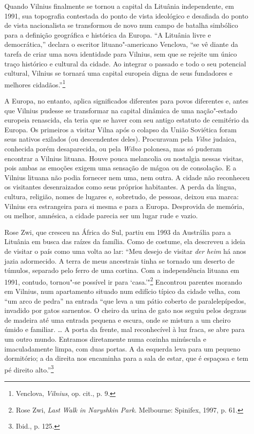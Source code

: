 Quando Vilnius finalmente se tornou a capital da Lituânia independente,
em 1991, sua topografia contestada do ponto de vista ideológico e desafiada do ponto de vista nacionalista se transformou de novo num campo de batalha simbólico para a
definição geográfica e histórica da Europa. ``A Lituânia livre e
democrática,'' declara o escritor lituano"-americano Venclova, ``se vê
diante da tarefa de criar uma nova identidade para Vilnius, sem que se
rejeite um único traço histórico e cultural da cidade. Ao integrar o
passado e todo o seu potencial cultural, Vilnius se tornará uma capital
europeia digna de seus fundadores e melhores cidadãos.''\footnote{Venclova, \textit{Vilnius}, op. cit., p. 9.}
\asterisc

A Europa, no entanto, aplica significados diferentes para povos
diferentes e, antes que Vilnius pudesse se transformar na capital
dinâmica de uma nação"-estado europeia renascida, ela teria que se haver
com seu antigo estatuto de cemitério da Europa. Os primeiros a visitar
Vilna após o colapso da União Soviética foram seus nativos exilados (ou
descendentes deles). Procuravam pela \textit{Vilne} judaica, conhecida porém
desaparecida, ou pela \textit{Wilno} polonesa, mas só puderam encontrar a Vilnius
lituana. Houve pouca melancolia ou nostalgia nessas visitas, pois ambas
as emoções exigem uma sensação de mágoa ou de consolação. E a Vilnius
lituana não podia fornecer nem uma, nem outra. A cidade não reconheceu
os visitantes desenraizados como seus próprios habitantes. A perda da
língua, cultura, religião, nomes de lugares e, sobretudo, de pessoas,
deixou sua marca: Vilnius era estrangeira para si mesma e para a Europa.
Desprovida de memória, ou melhor, amnésica, a cidade parecia ser um
lugar rude e vazio.

Rose Zwi, que cresceu na África do Sul, partiu em 1993 da Austrália para
a Lituânia em busca das raízes da família. Como de costume, ela
descreveu a ideia de visitar o país como uma volta ao lar: ``Meu desejo
de visitar \textit{der heim} há anos jazia adormecido. A terra de meus
ancestrais tinha se tornado um deserto de túmulos, separado pelo ferro
de uma cortina. Com a independência lituana em 1991, contudo, tornou"-se
possível ir para `casa.'"\footnote{Rose Zwi, \textit{Last Walk in Naryshkin Park}. Melbourne: Spinifex, 1997, p. 61.} Encontrou parentes morando em Vilnius, num apartamento situado num edifício típico
da cidade velha, com ``um arco de pedra'' na entrada ``que leva a um
pátio coberto de paralelepípedos, invadido por gatos sarnentos. O cheiro
da urina de gato nos seguiu pelos degraus de madeira até uma entrada
pequena e escura, onde se mistura a um cheiro úmido e familiar. \ldots{}
A porta da frente, mal reconhecível à luz fraca, se abre para um outro
mundo. Entramos diretamente numa cozinha minúscula e imaculadamente
limpa, com duas portas. A da esquerda leva para um pequeno dormitório; a
da direita nos encaminha para a sala de estar, que é espaçosa e tem pé
direito alto.''\footnote{Ibid., p. 125.}

